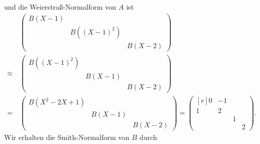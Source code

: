 und die Weierstraß-Normalform von $A$ ist
\begin{align*}
        &\,   \begin{pmatrix}
                B(X-1)  &                         &         \\
                        & B\left( (X-1)^2 \right) &         \\
                        &                         & B(X-2)
              \end{pmatrix}
  \\
  \approx&\,  \begin{pmatrix}
                B\left( (X-1)^2 \right) &         &         \\
                                        & B(X-1)  &         \\
                                        &         & B(X-2)
              \end{pmatrix}
  \\
  =&\,        \begin{pmatrix}
                B\left( X^2 - 2X + 1 \right)  &         &         \\
                                              & B(X-1)  &         \\
                                              &         & B(X-2)
              \end{pmatrix}
  =           \begin{pmatrix*}[r]
                0 & -1 &   &    \\
                1 &  2 &   &    \\
                  &    & 1 &    \\
                  &    &   & 2
              \end{pmatrix*}.
\end{align*}
Wir erhalten die Smith-Normalform von $B$ durch
